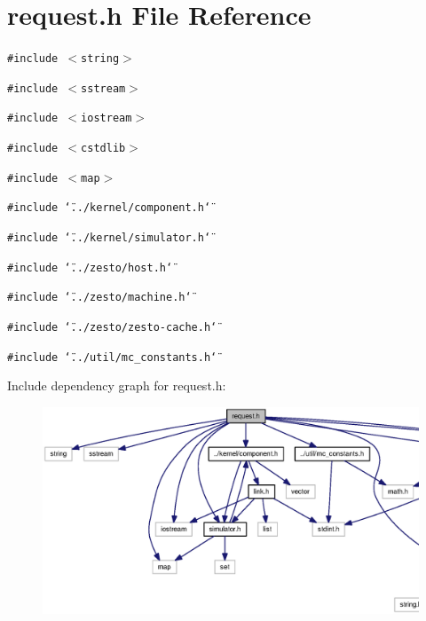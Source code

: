 \section{request.h File Reference}
\label{request_8h}
{\tt \#include $<$string$>$}\par
{\tt \#include $<$sstream$>$}\par
{\tt \#include $<$iostream$>$}\par
{\tt \#include $<$cstdlib$>$}\par
{\tt \#include $<$map$>$}\par
{\tt \#include \char`\"{}../kernel/component.h\char`\"{}}\par
{\tt \#include \char`\"{}../kernel/simulator.h\char`\"{}}\par
{\tt \#include \char`\"{}../zesto/host.h\char`\"{}}\par
{\tt \#include \char`\"{}../zesto/machine.h\char`\"{}}\par
{\tt \#include \char`\"{}../zesto/zesto-cache.h\char`\"{}}\par
{\tt \#include \char`\"{}../util/mc\_\-constants.h\char`\"{}}\par


Include dependency graph for request.h:\nopagebreak
\begin{figure}[H]
\begin{center}
\leavevmode
\includegraphics[width=420pt]{request_8h__incl}
\end{center}
\end{figure}


